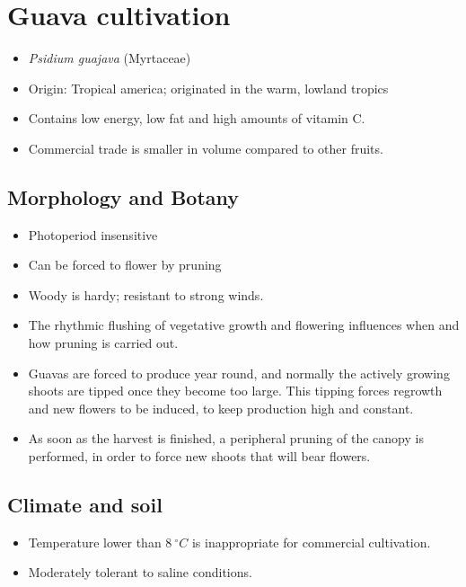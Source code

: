 \documentclass[
  openany]{book}
\providecommand{\tightlist}{%
  \setlength{\itemsep}{0pt}\setlength{\parskip}{0pt}}
\begin{document}
\hypertarget{guava-cultivation}{%
\section{Guava cultivation}\label{guava-cultivation}}

\begin{itemize}
\tightlist
\item
  \emph{Psidium guajava} (Myrtaceae)
\item
  Origin: Tropical america; originated in the warm, lowland tropics
\item
  Contains low energy, low fat and high amounts of vitamin C.
\item
  Commercial trade is smaller in volume compared to other fruits.
\end{itemize}

\hypertarget{morphology-and-botany}{%
\subsection{Morphology and Botany}\label{morphology-and-botany}}

\begin{itemize}
\tightlist
\item
  Photoperiod insensitive
\item
  Can be forced to flower by pruning
\item
  Woody is hardy; resistant to strong winds.
\item
  The rhythmic flushing of vegetative growth and flowering influences when and how pruning is
  carried out.
\item
  Guavas are forced to produce year round, and normally the actively growing shoots are tipped once they become too large. This tipping forces regrowth and new flowers to be induced, to keep production high and constant.
\item
  As soon as the harvest is finished, a peripheral pruning of the canopy is performed, in order to force new shoots that will bear flowers.
\end{itemize}

\hypertarget{climate-and-soil}{%
\subsection{Climate and soil}\label{climate-and-soil}}

\begin{itemize}
\tightlist
\item
  Temperature lower than \(8\ ^\circ C\) is inappropriate for commercial cultivation.
\item
  Moderately tolerant to saline conditions.
\end{itemize}
\end{document}

